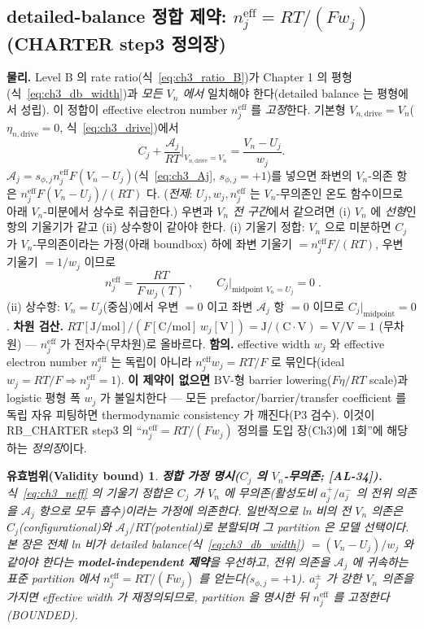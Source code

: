 \documentclass[11pt,a4paper]{article}
\newtheorem*{boundbox}{유효범위(Validity bound)}
\newcommand{\eff}{\mathrm{eff}}
\newcommand{\drive}{\mathrm{drive}}
\newcommand{\AL}[1]{\textsf{[AL-#1]}}
\begin{document}
\subsection{detailed-balance 정합 제약: $n_j^{\eff}=RT/(Fw_j)$ (CHARTER step3 정의장)}\label{sec:ch3_neff}
\textbf{물리.} Level B 의 rate ratio(식~\eqref{eq:ch3_ratio_B})가 Chapter 1 의 평형(식~\eqref{eq:ch3_db_width})과
\emph{모든 $V_n$ 에서} 일치해야 한다(detailed balance 는 평형에서 성립). 이 정합이 effective electron number
$n_j^{\eff}$ 를 \emph{고정}한다. 기본형 $V_{n,\drive}=V_n$($\eta_{n,\drive}=0$, 식~\eqref{eq:ch3_drive})에서
\begin{equation}
C_j+\frac{\mathcal A_j}{RT}\Big|_{V_{n,\drive}=V_n}=\frac{V_n-U_j}{w_j}.
\label{eq:ch3_dbmatch}
\end{equation}
$\mathcal A_j=s_{\phi,j}n_j^{\eff}F(V_n-U_j)$(식~\eqref{eq:ch3_Aj}, $s_{\phi,j}=+1$)를 넣으면 좌변의 $V_n$-의존
항은 $n_j^{\eff}F(V_n-U_j)/(RT)$ 다. (\emph{전제}: $U_j,w_j,n_j^{\eff}$ 는 $V_n$-무의존인 온도 함수이므로 아래
$V_n$-미분에서 상수로 취급한다.) 우변과 \emph{$V_n$ 전 구간}에서 같으려면 (i) $V_n$ 에 \emph{선형}인 항의
기울기가 같고 (ii) 상수항이 같아야 한다. (i) 기울기 정합: $V_n$ 으로 미분하면 $C_j$ 가 $V_n$-무의존이라는
가정(아래 boundbox) 하에 좌변 기울기 $=n_j^{\eff}F/(RT)$, 우변 기울기 $=1/w_j$ 이므로
\begin{equation}
\boxed{\;n_j^{\eff}=\frac{RT}{F\,w_j(T)}\;,\qquad C_j\big|_{\text{midpoint }V_n=U_j}=0\;.}
\label{eq:ch3_neff}
\end{equation}
(ii) 상수항: $V_n=U_j$(중심)에서 우변 $=0$ 이고 좌변 $\mathcal A_j$ 항 $=0$ 이므로 $C_j|_{\text{midpoint}}=0$.
\textbf{차원 검산.} $RT[\mathrm{J/mol}]/(F[\mathrm{C/mol}]\,w_j[\mathrm V])=\mathrm{J/(C\cdot V)}=\mathrm{V/V}=1$
(무차원) — $n_j^{\eff}$ 가 전자수(무차원)로 올바르다. \textbf{함의.} effective width $w_j$ 와 effective electron
number $n_j^{\eff}$ 는 독립이 아니라 $n_j^{\eff}w_j=RT/F$ 로 묶인다(ideal $w_j=RT/F\Rightarrow n_j^{\eff}=1$).
\textbf{이 제약이 없으면} BV-형 barrier lowering($F\eta/RT$ scale)과 logistic 평형 폭 $w_j$ 가 불일치한다 —
모든 prefactor/barrier/transfer coefficient 를 독립 자유 피팅하면 thermodynamic consistency 가 깨진다(P3 검수).
이것이 RB\_CHARTER step3 의 ``$n_j^{\eff}=RT/(Fw_j)$ 정의를 도입 장(Ch3)에 1회''에 해당하는 \emph{정의장}이다.
\begin{boundbox}
\textbf{정합 가정 명시($C_j$ 의 $V_n$-무의존; \AL{34}).} 식~\eqref{eq:ch3_neff} 의 기울기 정합은 $C_j$ 가 $V_n$
에 무의존(활성도비 $a_j^+/a_j^-$ 의 전위 의존을 $\mathcal A_j$ 항으로 모두 흡수)이라는 가정에 의존한다. 일반적으로
ln 비의 전 $V_n$ 의존은 $C_j$(configurational)와 $\mathcal A_j/RT$(potential)로 분할되며 그 partition 은 모델
선택이다. 본 장은 \emph{전체 ln 비가 detailed balance(식~\eqref{eq:ch3_db_width}) $=(V_n-U_j)/w_j$ 와 같아야
한다}는 \textbf{model-independent 제약}을 우선하고, 전위 의존을 $\mathcal A_j$ 에 귀속하는 표준 partition 에서
$n_j^{\eff}=RT/(Fw_j)$ 를 얻는다($s_{\phi,j}=+1$). $a_j^\pm$ 가 강한 $V_n$ 의존을 가지면 effective width 가
재정의되므로, partition 을 명시한 뒤 $n_j^{\eff}$ 를 고정한다(BOUNDED).
\end{boundbox}
\end{document}

